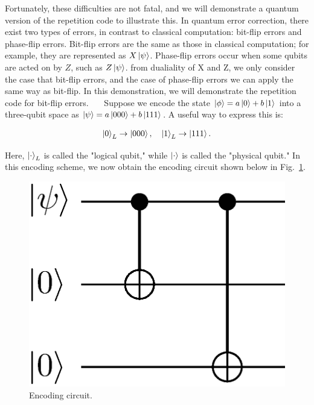 \documentclass[a4paper,11pt]{ltjsarticle}
\begin{document}
{{{            Fortunately, these difficulties are not fatal, and we will demonstrate a quantum version of the repetition code to illustrate this. In quantum error correction, there exist two types of errors, in contrast to classical computation: bit-flip errors and phase-flip errors. Bit-flip errors are the same as those in classical computation; for example, they are represented as $X\ket{\psi}$. Phase-flip errors occur when some qubits are acted on by $Z$, such as $Z\ket{\psi}$. from dualiality of X and Z, we only consider the case that bit-flip errors, and the case of phase-flip errors we can apply the same way as bit-flip. In this demonstration, we will demonstrate the repetition code for bit-flip errors. 
            \ \ \ Suppose we encode the state \(\ket{\phi} = a\ket{0} + b\ket{1}\) into a three-qubit space as \(\ket{\psi} = a\ket{000} + b\ket{111}\). A useful way to express this is:

            \begin{align}
                    \ket{0}_L \rightarrow \ket{000},\ \ \ \ket{1}_L \rightarrow \ket{111}.
            \end{align}

            Here, \(\ket{\cdot}_L\) is called the "logical qubit," while \(\ket{\cdot}\) is called the "physical qubit." In this encoding scheme, we now obtain the encoding circuit shown below in Fig.~\ref{encoding_repetition}.

            \begin{figure}[h]
                \centering
                \includegraphics[scale=0.40]{figure/encoding_repetition.eps}
                \vspace{-40pt}\caption{Encoding circuit.}
                \label{encoding_repetition}
                \vspace{-15pt}
            \end{figure}

}}}
\end{document}
